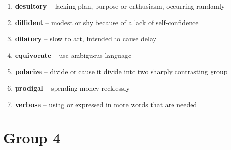 \begin{enumerate}[wide,labelindent=0pt]
\item \textbf{desultory} -- lacking plan, purpose or enthusiasm, occurring randomly
\item \textbf{diffident} -- modest or shy because of a lack of self-confidence
\item \textbf{dilatory} -- slow to act, intended to cause delay
\item \textbf{equivocate} -- use ambiguous language
\item \textbf{polarize} -- divide or cause it divide into two sharply contrasting group
\item \textbf{prodigal} -- spending money recklessly
\item \textbf{verbose} -- using or expressed in more words that are needed
\end{enumerate}

\newpage
\section{Group 4}

